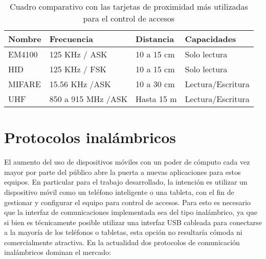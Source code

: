\begin{table}[ht]
	\centering
	\caption[Tarjetas de proximidad más utilizadas en el control de accesos]{Cuadro comparativo con las tarjetas de proximidad más utilizadas para el control de accesos}
	\begin{tabular}{C{15mm} C{40mm} C{25mm} C{35mm}}
		\toprule
		\textbf{Nombre} 	
			& \textbf{Frecuencia}
			& \textbf{Distancia}	
			& \textbf{Capacidades}
			\\
		\midrule
			EM4100 			
			& 125 KHz / ASK
			& 10 a 15 cm	
			& Solo lectura
			\\
			HID 			
			& 125 KHz / FSK
			& 10 a 15 cm	
			& Solo lectura
			\\
			MIFARE 			
			& 15.56 KHz /ASK
			& 10 a 30 cm	
			& Lectura/Escritura
			\\
			UHF 			
			& 850 a 915 MHz /ASK
			& Hasta 15 m	
			& Lectura/Escritura
			\\
		\bottomrule
		\hline
	\end{tabular}
	\label{tab:TarjetasUsadas}
\end{table}

\section{Protocolos inalámbricos}

El aumento del uso de dispositivos móviles con un poder de cómputo cada vez mayor por parte del público abre la puerta a nuevas aplicaciones para estos equipos. En particular para el trabajo desarrollado, la intención es utilizar un dispositivo móvil como un teléfono inteligente o una tableta, con el fin de gestionar y configurar el equipo para control de accesos. Para esto es necesario que la interfaz de comunicaciones implementada sea del tipo inalámbrico, ya que si bien es técnicamente posible utilizar una interfaz USB cableada para conectarse a la mayoría de los teléfonos o tabletas, esta opción no resultaría cómoda ni comercialmente atractiva. En la actualidad dos protocolos de comunicación inalámbricos dominan el mercado:

